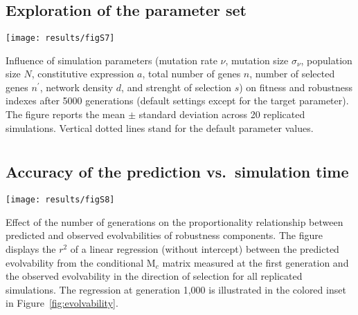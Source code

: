 \documentclass[10pt,a4paper]{article}
\newcommand{\M}{\bm{\mathrm M}}
\begin{document}
\begin{appendices}
  \clearpage
  \section{}
    \label{supp:explo}
    \subsection*{Exploration of the parameter set}
	\begin{adjustwidth}{-2.5in}{0in}
	\texttt{[image: results/figS7]} 
	
	{\color{Gray}Influence of simulation parameters (mutation rate $\nu$, mutation size $\sigma_\nu$, population size $N$, constitutive expression $a$, total number of genes $n$, number of selected genes $n^\prime$, network density $d$, and strenght of selection $s$) on fitness and robustness indexes after 5000 generations (default settings except for the target parameter). The figure reports the mean $\pm$ standard deviation across 20 replicated simulations. Vertical dotted lines stand for the default parameter values. }
	\end{adjustwidth}


	
  \clearpage
  \section{}
    \label{supp:r2evolv}
    \subsection*{Accuracy of the prediction vs.\ simulation time}
	\begin{center}
	\texttt{[image: results/figS8]} 
	\end{center}
	
	{\color{Gray} Effect of the number of generations on the proportionality relationship between predicted and observed evolvabilities of robustness components. The figure displays the $r^2$ of a linear regression (without intercept) between the predicted evolvability from the conditional $\M_c$ matrix measured at the first generation and the observed evolvability in the direction of selection for all replicated simulations. The regression at generation 1,000 is illustrated in the colored inset in Figure~\ref{fig:evolvability}. }
	
\end{appendices}
\end{document}
